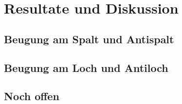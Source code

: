 \section{Resultate und Diskussion}


\subsection{Beugung am Spalt und Antispalt}

\subsection{Beugung am Loch und Antiloch}

\subsection{Noch offen}

